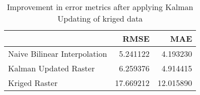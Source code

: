 \begin{table}
\caption{Improvement in error metrics after applying Kalman Updating of kriged data}
\label{tab:oahu6_gebco_raster_error}
\begin{tabular}{lrr}
\toprule
 & RMSE & MAE \\
\midrule
Naive Bilinear Interpolation & 5.241122 & 4.193230 \\
Kalman Updated Raster & 6.259376 & 4.914415 \\
Kriged Raster & 17.669212 & 12.015890 \\
\bottomrule
\end{tabular}
\end{table}
